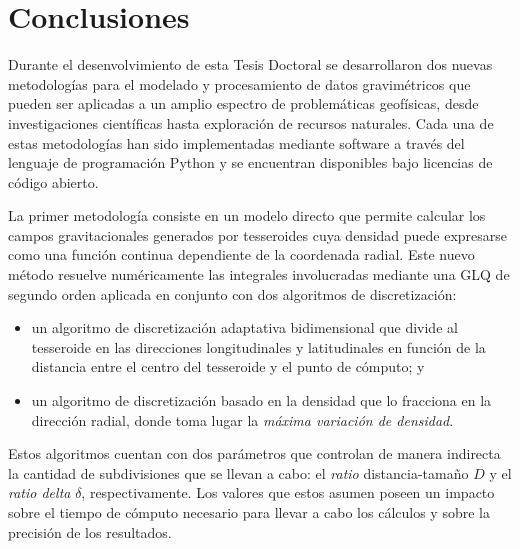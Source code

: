 \chapter{Conclusiones}

Durante el desenvolvimiento de esta Tesis Doctoral se desarrollaron dos nuevas
metodologías para el modelado y procesamiento de datos gravimétricos que pueden
ser aplicadas a un amplio espectro de problemáticas geofísicas,
desde investigaciones científicas hasta exploración de recursos
naturales.
Cada una de estas metodologías han sido implementadas mediante software
a través del lenguaje de programación Python y se encuentran disponibles bajo
licencias de código abierto.

\vspace{1em}

La primer metodología consiste en un modelo directo que permite calcular los
campos gravitacionales generados por tesseroides cuya densidad puede expresarse
como una función continua dependiente de la coordenada radial.
Este nuevo método resuelve numéricamente las integrales involucradas mediante
una \acl{GLQ} de segundo orden aplicada en conjunto con dos algoritmos de
discretización:

\begin{itemize}
    \item un algoritmo de discretización adaptativa bidimensional que divide al
        tesseroide en las direcciones longitudinales y latitudinales en función
        de la distancia entre el centro del tesseroide y el punto de cómputo; y
    \item  un algoritmo de discretización basado en la densidad que lo
        fracciona en la dirección radial, donde toma lugar la \emph{máxima
        variación de densidad}.
\end{itemize}

Estos algoritmos cuentan con dos parámetros que controlan de manera indirecta
la cantidad de subdivisiones que se llevan a cabo: el \emph{ratio}
distancia-tamaño $D$ y el \emph{ratio delta} $\delta$, respectivamente.
Los valores que estos asumen poseen un impacto sobre el tiempo de cómputo
necesario para llevar a cabo los cálculos y sobre la precisión de los
resultados.

